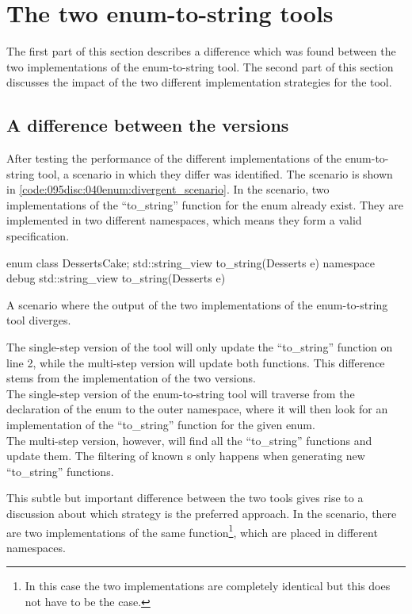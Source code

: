 \section{The two enum-to-string tools}

The first part of this section describes a difference which was found between the two implementations of the enum-to-string tool.
The second part of this section discusses the impact of the two different implementation strategies for the tool.

\subsection{A difference between the versions}
After testing the performance of the different implementations of the enum-to-string tool, a scenario in which they differ was identified. The scenario is shown in \cref{code:095disc:040enum:divergent_scenario}. In the scenario, two implementations of the ``to\_string'' function for the  enum already exist. They are implemented in two different namespaces, which means they form a valid specification.

\begin{listing}[H]
    \begin{cppcode}
enum class Desserts{Cake};
std::string_view to_string(Desserts e){}
namespace debug {
    std::string_view to_string(Desserts e){}
}
    \end{cppcode}
    \caption{A scenario where the output of the two implementations of the enum-to-string tool diverges.}
    \label{code:095disc:040enum:divergent_scenario}
  \end{listing}

The single-step version of the tool will only update the ``to\_string'' function on line 2, while the multi-step version will update both functions.
This difference stems from the implementation of the two versions.\\
The single-step version of the enum-to-string tool will traverse from the declaration of the enum to the outer namespace, where it will then look for an implementation of the ``to\_string'' function for the given enum.\\
The multi-step version, however, will find all the ``to\_string'' functions and update them. The filtering of known s only happens when generating new ``to\_string'' functions.

This subtle but important difference between the two tools gives rise to a discussion about which strategy is the preferred approach. In the scenario, there are two implementations of the same function\footnote{In this case the two implementations are completely identical but this does not have to be the case.}, which are placed in different namespaces. 

